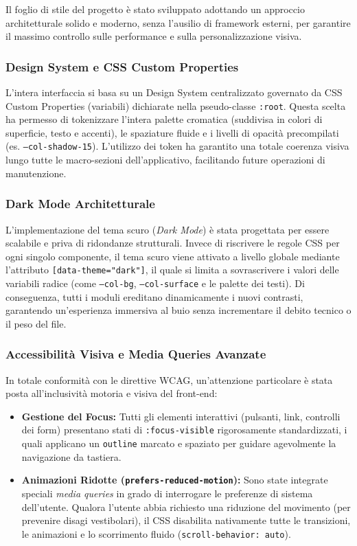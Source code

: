 \documentclass[11pt,a4paper]{article}
\begin{document}
Il foglio di stile del progetto è stato sviluppato adottando un approccio architetturale solido e moderno, senza l'ausilio di framework esterni, per garantire il massimo controllo sulle performance e sulla personalizzazione visiva.

\subsubsection{Design System e CSS Custom Properties}
L'intera interfaccia si basa su un Design System centralizzato governato da CSS Custom Properties (variabili) dichiarate nella pseudo-classe \texttt{:root}. Questa scelta ha permesso di tokenizzare l'intera palette cromatica (suddivisa in colori di superficie, testo e accenti), le spaziature fluide e i livelli di opacità precompilati (es. \texttt{--col-shadow-15}). L'utilizzo dei token ha garantito una totale coerenza visiva lungo tutte le macro-sezioni dell'applicativo, facilitando future operazioni di manutenzione.

\subsubsection{Dark Mode Architetturale}
L'implementazione del tema scuro (\textit{Dark Mode}) è stata progettata per essere scalabile e priva di ridondanze strutturali. Invece di riscrivere le regole CSS per ogni singolo componente, il tema scuro viene attivato a livello globale mediante l'attributo \texttt{[data-theme="dark"]}, il quale si limita a sovrascrivere i valori delle variabili radice (come \texttt{--col-bg}, \texttt{--col-surface} e le palette dei testi). Di conseguenza, tutti i moduli ereditano dinamicamente i nuovi contrasti, garantendo un'esperienza immersiva al buio senza incrementare il debito tecnico o il peso del file.

\subsubsection{Accessibilità Visiva e Media Queries Avanzate}
In totale conformità con le direttive WCAG, un'attenzione particolare è stata posta all'inclusività motoria e visiva del front-end:
\begin{itemize}
    \item \textbf{Gestione del Focus:} Tutti gli elementi interattivi (pulsanti, link, controlli dei form) presentano stati di \texttt{:focus-visible} rigorosamente standardizzati, i quali applicano un \texttt{outline} marcato e spaziato per guidare agevolmente la navigazione da tastiera.
    \item \textbf{Animazioni Ridotte (\texttt{prefers-reduced-motion}):} Sono state integrate speciali \textit{media queries} in grado di interrogare le preferenze di sistema dell'utente. Qualora l'utente abbia richiesto una riduzione del movimento (per prevenire disagi vestibolari), il CSS disabilita nativamente tutte le transizioni, le animazioni e lo scorrimento fluido (\texttt{scroll-behavior: auto}).
\end{itemize}
\end{document}
